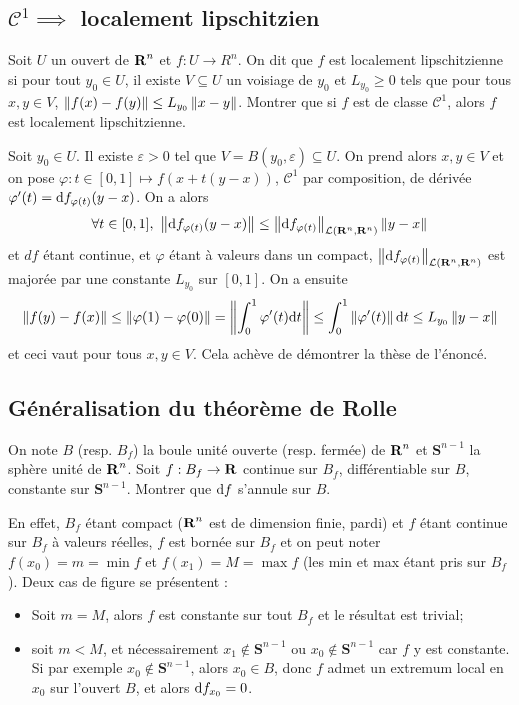 \subsection{$\mathcal C^1\implies$ localement lipschitzien}
\begin{exercice}
    Soit $U$ un ouvert de $\operatorname{\mathbf{R}}^n$ et $f:U\to R^n$. 
    On dit que $f$ est localement lipschitzienne si pour tout $y_0\in U$, 
    il existe $V\subseteq U$ un voisiage de $y_0$ et $L_{y_0}\geq 0$ tels que pour tous $x,y\in V$, $\left\lVert f(x)-f(y)\right\rVert\leq L_{y_0}\left\lVert x-y\right\rVert$.
    Montrer que si $f$ est de classe $\mathcal C^1$, alors $f$ est localement lipschitzienne. 
\end{exercice}

\begin{correction}
    Soit $y_0\in U$. Il existe $\varepsilon >0$ tel que $V=B(y_0,\varepsilon)\subseteq U$. On prend alors $x,y\in V$ 
    et on pose $\varphi:t\in[0,1]\mapsto f(x+t(y-x))$, $\mathcal C^1$ par composition, de dérivée $\varphi'(t)=\mathrm{d} f_{\varphi(t)}(y-x)$. 
    On a alors
    \[
        \forall t\in[0,1],\ \left\lVert \mathrm{d} f_{\varphi(t)}(y-x)\right\rVert\leq\left\lVert \mathrm{d} f_{\varphi(t)}\right\rVert_{\mathcal L(\operatorname{\mathbf{R}}^n,\operatorname{\mathbf{R}}^n)}\left\lVert y-x\right\rVert
    \]
    et $df$ étant continue, et $\varphi$ étant à valeurs dans un compact, $\left\lVert \mathrm{d} f_{\varphi(t)}\right\rVert_{\mathcal L(\operatorname{\mathbf{R}}^n,\operatorname{\mathbf{R}}^n)}$ est majorée par une constante $L_{y_0}$ sur $[0,1]$.
    On a ensuite 
    \[
        \left\lVert f(y)-f(x)\right\rVert\leq\left\lVert \varphi(1)-\varphi(0)\right\rVert=\left\lVert \int_0^1\varphi'(t)\mathrm{d} t\right\rVert\leq\int_0^1\left\lVert \varphi'(t)\right\rVert\mathrm{d} t\leq L_{y_0}\left\lVert y-x\right\rVert
    \]
    et ceci vaut pour tous $x,y\in V$. 
    Cela achève de démontrer la thèse de l'énoncé.
\end{correction}

\subsection{Généralisation du théorème de Rolle}
\begin{exercice}
    On note $B$ (resp. $B_f$) la boule unité ouverte (resp. fermée) de $\operatorname{\mathbf{R}}^n$ et $\mathbf S^{n-1}$ la sphère unité de $\operatorname{\mathbf{R}}^n$.
    Soit $f:B_f\to\operatorname{\mathbf{R}}$ continue sur $B_f$, différentiable sur $B$, constante sur $\mathbf S^{n-1}$.
    Montrer que $\mathrm{d} f$ s'annule sur $B$.
\end{exercice}

\begin{correction}
    En effet, $B_f$ étant compact ($\operatorname{\mathbf{R}}^n$ est de dimension finie, pardi) et $f$ étant continue sur $B_f$ à valeurs réelles,
    $f$ est bornée sur $B_f$ et on peut noter $f(x_0)=m=\min f$ et $f(x_1)=M=\max f$ (les min et max étant pris sur $B_f$).
    Deux cas de figure se présentent :
    \begin{itemize}
        \item Soit $m = M$, alors $f$ est constante sur tout $B_f$ et le résultat est trivial;
        \item soit $m<M$, et nécessairement $x_1\notin \mathbf S^{n-1}$ ou $x_0\notin \mathbf S^{n-1}$ car $f$ y est constante. 
        Si par exemple $x_0\notin\mathbf S^{n-1}$, alors $x_0\in B$, donc $f$ admet un extremum local en $x_0$ sur l'ouvert $B$, et alors $\mathrm{d} f_{x_0}=0$.
    \end{itemize}
\end{correction}